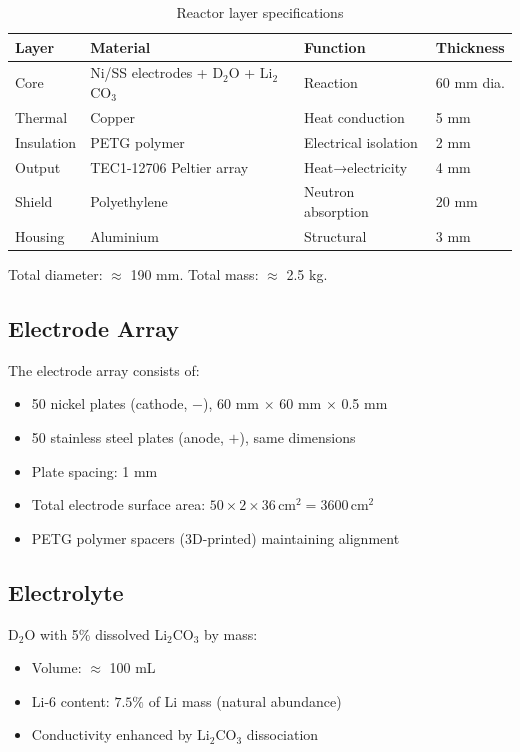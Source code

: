 \documentclass[12pt,a4paper]{article}
\begin{document}
\begin{table}[h!]
\centering
\caption{Reactor layer specifications}
\vspace{0.5em}
\begin{tabular}{llll}
\toprule
\textbf{Layer} & \textbf{Material} & \textbf{Function} & \textbf{Thickness} \\
\midrule
Core & Ni/SS electrodes + D$_2$O + Li$_2$CO$_3$ & Reaction & 60 mm dia. \\
Thermal & Copper & Heat conduction & 5 mm \\
Insulation & PETG polymer & Electrical isolation & 2 mm \\
Output & TEC1-12706 Peltier array & Heat→electricity & 4 mm \\
Shield & Polyethylene & Neutron absorption & 20 mm \\
Housing & Aluminium & Structural & 3 mm \\
\bottomrule
\end{tabular}
\end{table}

Total diameter: $\approx$ 190 mm. Total mass: $\approx$ 2.5 kg.

\subsection{Electrode Array}

The electrode array consists of:
\begin{itemize}
\item 50 nickel plates (cathode, $-$), 60 mm $\times$ 60 mm $\times$ 0.5 mm
\item 50 stainless steel plates (anode, $+$), same dimensions
\item Plate spacing: 1 mm
\item Total electrode surface area: $50 \times 2 \times 36\,\text{cm}^2 = 3600\,\text{cm}^2$
\item PETG polymer spacers (3D-printed) maintaining alignment
\end{itemize}

\subsection{Electrolyte}

D$_2$O with 5\% dissolved Li$_2$CO$_3$ by mass:
\begin{itemize}
\item Volume: $\approx$ 100 mL
\item Li-6 content: $7.5\%$ of Li mass (natural abundance)
\item Conductivity enhanced by Li$_2$CO$_3$ dissociation
\end{itemize}
\end{document}
